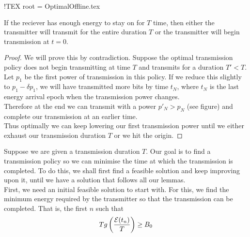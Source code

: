 !TEX root = OptimalOffline.tex
\begin{lemma}
If the reciever has enough energy to stay on for $T$ time, then either the transmitter will transmit for the entire duration $T$ or the transmitter will begin transmission at $t=0$.
\label{transmission_duration}
\end{lemma}
\begin{proof}
We will prove this by contradiction. Suppose the optimal transmission policy does not begin transmitting at time $T$ and transmits for a duration $T' < T$.\\
Let $p_1$ be the first power of transmission in this policy. If we reduce this slightly to $p_1-\delta p_1$, we will have transmitted more bits by time $t_N$, where $t_N$ is the last energy arrival epoch when the transmission power changes. \\
Therefore at the end we can transmit with a power $p'_N > p_N$ (see figure) and complete our transmission at an earlier time.\\
Thus optimally we can keep lowering our first transmission power until we either exhaust our transmission duration $T$ or we hit the origin.
\end{proof}

Suppose we are given a transmission duration $T$. Our goal is to find a transmission policy so we can minimise the time at which the transmission is completed. To do this, we shall first find a feasible solution and keep improving upon it, until we have a solution that follows all our lemmas. 
\\First, we need an initial feasible solution to start with. For this, we find the minimum energy required by the transmitter so that the transmission can be completed. That is, the first $n$ such that
\begin{equation}
Tg\left(\frac{\mathcal{E}(t_n)}{T}\right)\geq B_0
\end{equation}

